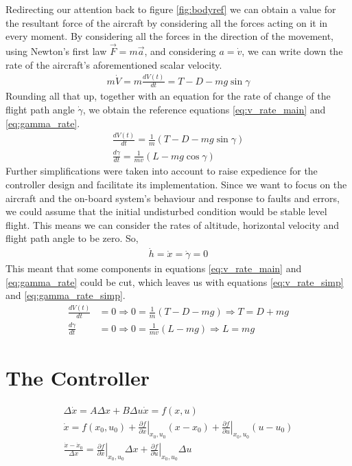 \documentclass[english,palatino]{ist-report}
\begin{document}
Redirecting our attention back to figure \ref{fig:bodyref} we can obtain a value for the resultant force of the aircraft by considering all the forces acting on it in every moment. By considering all the forces in the direction of the movement, using Newton's first law $\vec{F} = m\vec{a}$, and considering $a = \dot{v}$, we can write down the rate of the aircraft's aforementioned scalar velocity.
\begin{gather}\label{eq:v_rate}
	m\dot{V} = m\frac{dV(t)}{dt} = T - D - mg\sin\gamma
\end{gather}
Rounding all that up, together with an equation for the rate of change of the flight path angle $\dot{\gamma}$, we obtain the reference equations \ref{eq:v_rate_main} and \ref{eq:gamma_rate}.
\begin{align}
	\label{eq:v_rate_main}
	\frac{dV(t)}{dt} = \frac{1}{m}\left(T - D - mg\sin\gamma\right) \\
	\label{eq:gamma_rate}
	\frac{d\gamma}{dt} = \frac{1}{mv}\left(L - mg\cos\gamma\right)
\end{align}
Further simplifications were taken into account to raise expedience for the controller design and facilitate its implementation. Since we want to focus on the aircraft and the on-board system's behaviour and response to faults and errors, we could assume that the initial undisturbed condition would be stable level flight. This means we can consider the rates of altitude, horizontal velocity and flight path angle to be zero. So,
\begin{gather*}
	\dot{h} = \dot{x} = \dot{\gamma} = 0
\end{gather*}
This meant that some components in equations \ref{eq:v_rate_main} and \ref{eq:gamma_rate} could be cut, which leaves us with equations \ref{eq:v_rate_simp} and \ref{eq:gamma_rate_simp}.
\begin{align}
	\label{eq:v_rate_simp}
	\frac{dV(t)}{dt} &= 0 \Rightarrow 0 = \frac{1}{m}\left(T - D - mg\right) \Rightarrow T = D + mg \\
	\label{eq:gamma_rate_simp}
	\frac{d\gamma}{dt} &= 0 \Rightarrow 0 = \frac{1}{mv}\left(L - mg\right) \Rightarrow L = mg
\end{align}

\section{The Controller}

\begin{gather*}
	\Delta \dot{x} = A\Delta x + B\Delta u
	\dot{x} = f(x,u) \\
	\dot{x} = f(x_0,u_0) + \left.\frac{\partial f}{\partial x}\right|_{x_0,u_0}(x - x_0) + \left.\frac{\partial f}{\partial u}\right|_{x_0,u_0}(u - u_0) \\
	\frac{\dot{x} - \dot{x}_0}{\Delta x} = \left.\frac{\partial f}{\partial x}\right|_{x_0,u_0}\Delta x + \left.\frac{\partial f}{\partial u}\right|_{x_0,u_0}\Delta u
\end{gather*}
\end{document}
